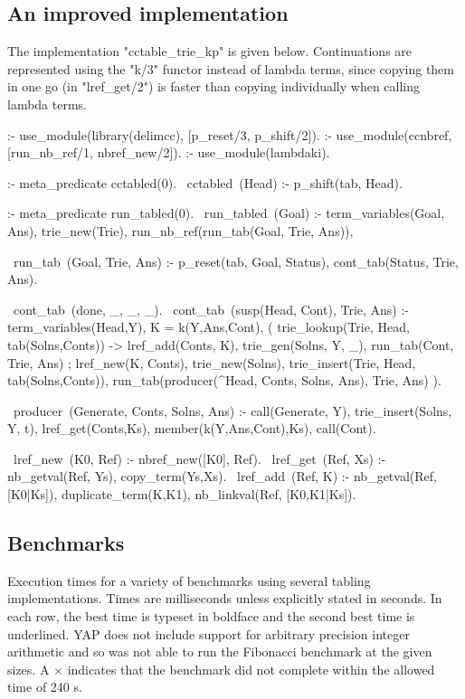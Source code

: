 \subsection{An improved implementation}

The implementation "cctable_trie_kp" is given below. Continuations are represented using
the "k/3" functor instead of lambda terms, since copying them in one go (in "lref_get/2") is faster
than copying individually when calling lambda terms. 
\begin{prolog-framed}[name=cctable8,numbers=left]
  :- use_module(library(delimcc), [p_reset/3, p_shift/2]).
  :- use_module(ccnbref, [run_nb_ref/1, nbref_new/2]).
  :- use_module(lambdaki).
        
  :- meta_predicate cctabled(0). 
  ~cctabled~(Head) :- p_shift(tab, Head).

  :- meta_predicate run_tabled(0). 
  ~run_tabled~(Goal) :-
     term_variables(Goal, Ans), trie_new(Trie),
     run_nb_ref(run_tab(Goal, Trie, Ans)),

  ~run_tab~(Goal, Trie, Ans) :-
     p_reset(tab, Goal, Status),
     cont_tab(Status, Trie, Ans).

  ~cont_tab~(done, _, _, _).
  ~cont_tab~(susp(Head, Cont), Trie, Ans) :-  
     term_variables(Head,Y), K = k(Y,Ans,Cont),
     (  trie_lookup(Trie, Head, tab(Solns,Conts))
     -> lref_add(Conts, K),
        trie_gen(Solns, Y, _),
        run_tab(Cont, Trie, Ans)
     ;  lref_new(K, Conts),
        trie_new(Solns),
        trie_insert(Trie, Head, tab(Solns,Conts)),
        run_tab(producer(\Y^Head, Conts, Solns, Ans), Trie, Ans)
     ).

  ~producer~(Generate, Conts, Solns, Ans) :-
     call(Generate, Y),
     trie_insert(Solns, Y, t),
     lref_get(Conts,Ks), member(k(Y,Ans,Cont),Ks),
     call(Cont).

  ~lref_new~(K0, Ref) :- nbref_new([K0], Ref).
  ~lref_get~(Ref, Xs) :- nb_getval(Ref, Ys), copy_term(Ys,Xs).
  ~lref_add~(Ref, K) :- 
    nb_getval(Ref, [K0|Ks]), duplicate_term(K,K1), 
    nb_linkval(Ref, [K0,K1|Ks]).
\end{prolog-framed}

\subsection{Benchmarks}

\begin{table}
\small%
\begin{center}

\end{center}
\caption{Execution times for a variety of benchmarks using several tabling implementations.
Times are milliseconds unless explicitly stated in seconds. In each row, the best time
is typeset in boldface and the second best time is underlined. YAP does not include
support for arbitrary precision integer arithmetic and so was not able to run
the Fibonacci benchmark at the given sizes. A $\times$ indicates that the benchmark
did not complete within the allowed time of 240 s.}
\end{table}

